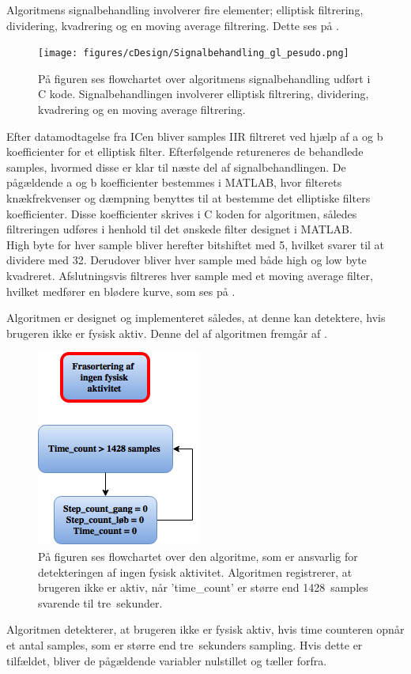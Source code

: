 Algoritmens signalbehandling involverer fire elementer; elliptisk filtrering, dividering, kvadrering og en moving average filtrering. Dette ses på .
\begin{figure}[H]
	\centering
	\texttt{[image: figures/cDesign/Signalbehandling\_gl\_pesudo.png]}
	\caption{På figuren ses flowchartet over algoritmens signalbehandling udført i C kode. Signalbehandlingen involverer elliptisk filtrering, dividering, kvadrering og en moving average filtrering.}
	\label{fig:signalbehandling_g_l}
\end{figure}\vspace{-0.25cm}
Efter datamodtagelse fra ICen bliver samples IIR filtreret ved hjælp af a og b koefficienter for et elliptisk filter. Efterfølgende retureneres de behandlede samples, hvormed disse er klar til næste del af signalbehandlingen. De pågældende a og b koefficienter bestemmes i MATLAB, hvor filterets knækfrekvenser og dæmpning benyttes til at bestemme det elliptiske filters koefficienter. Disse koefficienter skrives i C koden for algoritmen, således filtreringen udføres i henhold til det ønskede filter designet i MATLAB.\\
High byte for hver sample bliver herefter bitshiftet med 5, hvilket svarer til at dividere med 32. Derudover bliver hver sample med både high og low byte kvadreret. Afslutningsvis filtreres hver sample med et moving average filter, hvilket medfører en blødere kurve, som ses på .

Algoritmen er designet og implementeret således, at denne kan detektere, hvis brugeren ikke er fysisk aktiv. Denne del af algoritmen fremgår af .
\begin{figure}[H]
	\centering
	\includegraphics[scale=0.6]{figures/cDesign/ingen_aktivitet_gl_pseudo.png}
	\caption{På figuren ses flowchartet over den algoritme, som er ansvarlig for detekteringen af ingen fysisk aktivitet. Algoritmen registrerer, at brugeren ikke er aktiv, når 'time\_count' er større end 1428~samples svarende til tre~sekunder.}
	\label{fig:ingen_ak_pseudo}
\end{figure}\vspace{-0.25cm}
Algoritmen detekterer, at brugeren ikke er fysisk aktiv, hvis time counteren opnår et antal samples, som er større end tre~sekunders sampling. Hvis dette er tilfældet, bliver de pågældende variabler nulstillet og tæller forfra.

